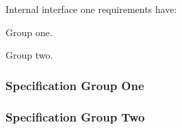 Internal interface one requirements have:

\begin{my_enumerate}
	\item Group one.
	\item Group two.
\end{my_enumerate}

\renewcommand{\ThisSegment}{Acoustic Array and Lower Spreader\xspace}

\KNEADSUBSUBSECTIONNEWPAGE
\subsubsection{Specification Group One}
\label{loc:IIF_OneGroupOne}



\KNEADSUBSUBSECTIONNEWPAGE
\subsubsection{Specification Group Two}
\label{loc:IIF_OneGroupTwo}

